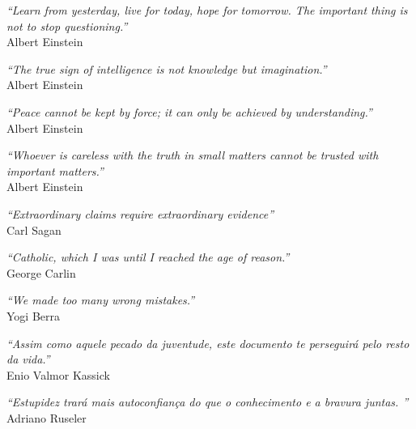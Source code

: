 


\begin{epigrafe}

    \vspace*{\fill}\lang
    {
        \begin{flushright}
            \textit{``Learn from yesterday, live for today, hope for tomorrow. The important thing is not to stop questioning.''} \\ Albert Einstein
        \end{flushright}
        \begin{flushright}
            \textit{``The true sign of intelligence is not knowledge but imagination.''} \\  Albert Einstein
        \end{flushright}
        \begin{flushright}
            \textit{``Peace cannot be kept by force; it can only be achieved by understanding.''} \\ Albert Einstein
        \end{flushright}
        \begin{flushright}
            \textit{``Whoever is careless with the truth in small matters cannot be trusted with important matters.''} \\ Albert Einstein
        \end{flushright}
        \begin{flushright}
            \textit{``Extraordinary claims require extraordinary evidence''} \\ Carl Sagan
        \end{flushright}
        \begin{flushright}
            \textit{``Catholic, which I was until I reached the age of reason.''} \\ George Carlin
        \end{flushright}
        \begin{flushright}
            \textit{``We made too many wrong mistakes.''} \\ Yogi Berra
        \end{flushright}
    }
    {
        \begin{flushright}
            \textit{``Assim como aquele pecado da juventude, este documento te perseguirá pelo resto da vida.''} \\ Enio Valmor Kassick
        \end{flushright}
        \begin{flushright}
            \textit{``Estupidez trará mais autoconfiança do que o conhecimento e a bravura juntas. \englishword{\showfont}''} \\ Adriano Ruseler
        \end{flushright}
    }

\end{epigrafe}


